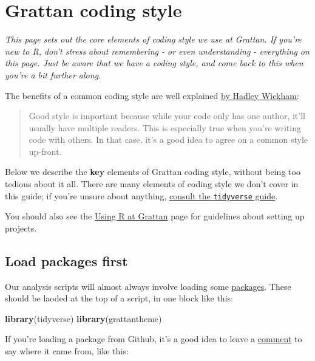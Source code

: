 \documentclass[]{book}
\newenvironment{Shaded}{\begin{snugshade}}{\end{snugshade}}
\newcommand{\KeywordTok}[1]{\textcolor[rgb]{0.13,0.29,0.53}{\textbf{#1}}}
\newcommand{\NormalTok}[1]{#1}
\begin{document}
\hypertarget{coding-style}{%
\chapter{Grattan coding style}\label{coding-style}}

\emph{This page sets out the core elements of coding style we use at Grattan. If you're new to R, don't stress about remembering - or even understanding - everything on this page. Just be aware that we have a coding style, and come back to this when you're a bit further along.}

The benefits of a common coding style are well explained \href{http://r-pkgs.had.co.nz/style.html}{by Hadley Wickham}:

\begin{quote}
Good style is important because while your code only has one author, it'll usually have multiple readers. This is especially true when you're writing code with others. In that case, it's a good idea to agree on a common style up-front.
\end{quote}

Below we describe the \textbf{key} elements of Grattan coding style, without being too tedious about it all. There are many elements of coding style we don't cover in this guide; if you're unsure about anything, \href{https://style.tidyverse.org/}{consult the \texttt{tidyverse} guide}.

You should also see the \protect\hyperlink{organising-projects}{Using R at Grattan} page for guidelines about setting up projects.

\hypertarget{load-packages-first}{%
\section{Load packages first}\label{load-packages-first}}

Our analysis scripts will almost always involve loading some \protect\hyperlink{packages}{packages}. These should be laoded at the top of a script, in one block like this:

\begin{Shaded}
\begin{Highlighting}[]
\KeywordTok{library}\NormalTok{(tidyverse)}
\KeywordTok{library}\NormalTok{(grattantheme)}
\end{Highlighting}
\end{Shaded}

If you're loading a package from Github, it's a good idea to leave a \protect\hyperlink{use-comments}{comment} to say where it came from, like this:
\end{document}

